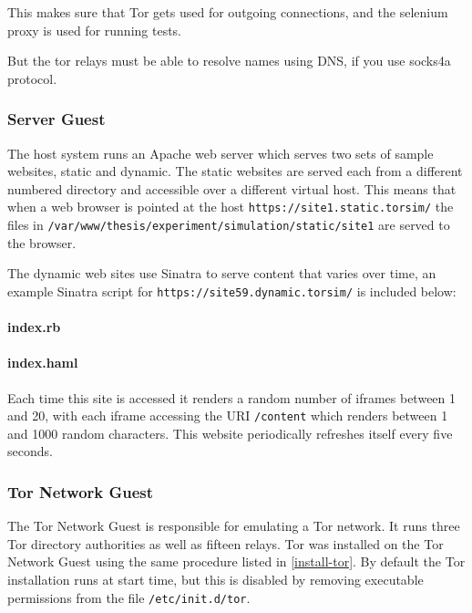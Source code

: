 This makes sure that Tor gets used for outgoing connections, and the selenium
proxy is used for running tests.

But the tor relays must be able to resolve names using DNS, if you use socks4a
protocol.

\subsubsection{Server Guest}

The host system runs an Apache web server which serves two sets of sample
websites, static and dynamic. The static websites are served each from a
different numbered directory and accessible over a different virtual host. This
means that when a web browser is pointed at the host
\verb+https://site1.static.torsim/+ the files in
\verb+/var/www/thesis/experiment/simulation/static/site1+ are served to the
browser.

The dynamic web sites use Sinatra to serve content that varies over time, an
example Sinatra script for \verb+https://site59.dynamic.torsim/+ is included
below:

\paragraph{index.rb}


\paragraph{index.haml}


Each time this site is accessed it renders a random number of iframes between 1
and 20, with each iframe accessing the URI \verb+/content+ which renders between
1 and 1000 random characters. This website periodically refreshes itself every
five seconds.

\subsubsection{Tor Network Guest}

The Tor Network Guest is responsible for emulating a Tor network. It runs three
Tor directory authorities as well as fifteen relays. Tor was installed on the
Tor Network Guest using the same procedure listed in \ref{install-tor}. By
default the Tor installation runs at start time, but this is disabled by
removing executable permissions from the file \verb+/etc/init.d/tor+.

